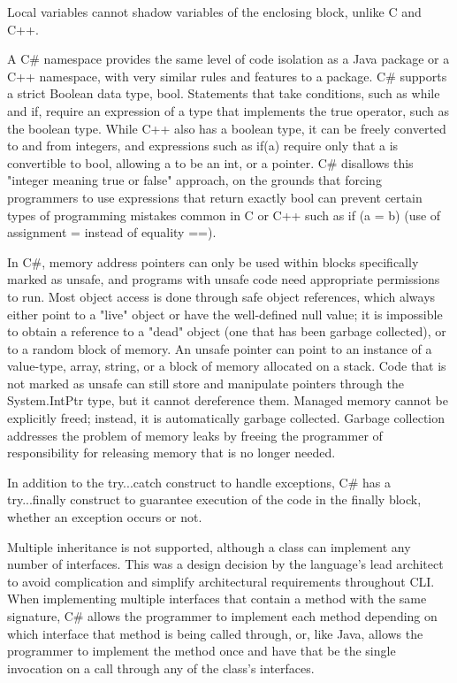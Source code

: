 \vpara
Local variables cannot shadow variables of the enclosing block, unlike C and C++.

\vpara
A C\# namespace provides the same level of code isolation as a Java package or a C++ namespace, with very similar rules and features to a package.
C\# supports a strict Boolean data type, bool. Statements that take conditions, such as while and if, require an expression of a type that implements the true operator, such as the boolean type. While C++ also has a boolean type, it can be freely converted to and from integers, and expressions such as if(a) require only that a is convertible to bool, allowing a to be an int, or a pointer. C\# disallows this "integer meaning true or false" approach, on the grounds that forcing programmers to use expressions that return exactly bool can prevent certain types of programming mistakes common in C or C++ such as if (a = b) (use of assignment = instead of equality ==).

\vpara
In C\#, memory address pointers can only be used within blocks specifically marked as unsafe, and programs with unsafe code need appropriate permissions to run. Most object access is done through safe object references, which always either point to a "live" object or have the well-defined null value; it is impossible to obtain a reference to a "dead" object (one that has been garbage collected), or to a random block of memory. An unsafe pointer can point to an instance of a value-type, array, string, or a block of memory allocated on a stack. Code that is not marked as unsafe can still store and manipulate pointers through the System.IntPtr type, but it cannot dereference them.
Managed memory cannot be explicitly freed; instead, it is automatically garbage collected. Garbage collection addresses the problem of memory leaks by freeing the programmer of responsibility for releasing memory that is no longer needed.

\vpara
In addition to the try...catch construct to handle exceptions, C\# has a try...finally construct to guarantee execution of the code in the finally block, whether an exception occurs or not.

\vpara
Multiple inheritance is not supported, although a class can implement any number of interfaces. This was a design decision by the language's lead architect to avoid complication and simplify architectural requirements throughout CLI. When implementing multiple interfaces that contain a method with the same signature, C\# allows the programmer to implement each method depending on which interface that method is being called through, or, like Java, allows the programmer to implement the method once and have that be the single invocation on a call through any of the class's interfaces.

